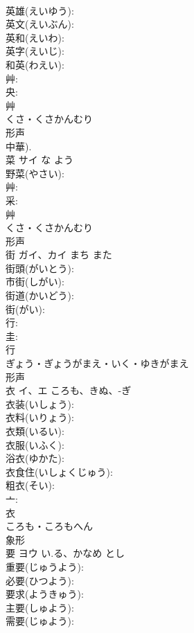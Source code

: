 \documentclass[8pt]{extreport}
\begin{document}
\begin{CJK}{UTF8}{min}
\\	英雄(えいゆう): 
\\	英文(えいぶん): 
\\	英和(えいわ): 
\\	英字(えいじ): 
\\	和英(わえい): 
\\	艸: 
\\	央: 
\\	艸	
\\	くさ・くさかんむり	
\\	形声 
\\	中華).
\\	菜	サイ	な	よう	
\\	野菜(やさい): 
\\	艸: 
\\	采: 
\\	艸	
\\	くさ・くさかんむり	
\\	形声 
\\	街	ガイ、カイ	まち	また	
\\	街頭(がいとう): 
\\	市街(しがい): 
\\	街道(かいどう): 
\\	街(がい): 
\\	行: 
\\	圭: 
\\	行	
\\	ぎょう・ぎょうがまえ・いく・ゆきがまえ	
\\	形声 
\\	衣	イ、エ	ころも、きぬ、-ぎ		
\\	衣装(いしょう): 
\\	衣料(いりょう): 
\\	衣類(いるい): 
\\	衣服(いふく): 
\\	浴衣(ゆかた): 
\\	衣食住(いしょくじゅう): 
\\	粗衣(そい): 
\\	亠: 
\\	衣	
\\	ころも・ころもへん	
\\	象形 
\\	要	ヨウ	い.る、かなめ	とし	
\\	重要(じゅうよう): 
\\	必要(ひつよう): 
\\	要求(ようきゅう): 
\\	主要(しゅよう): 
\\	需要(じゅよう): 

\end{CJK}
\end{document}
